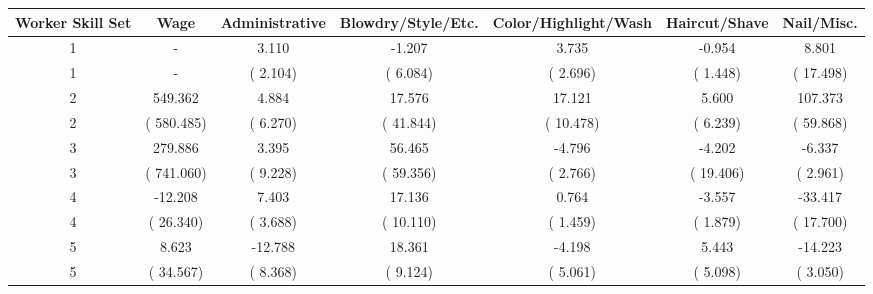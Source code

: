 
\centering
\begin{tabular}[t]{ccccccc}
\toprule
Worker Skill Set & Wage & Administrative & Blowdry/Style/Etc. & Color/Highlight/Wash & Haircut/Shave & Nail/Misc.\\
\midrule
1 & - & 3.110 & -1.207 & 3.735 & -0.954 & 8.801\\
1 & - & (    2.104) & (    6.084) & (    2.696) & (    1.448) & (   17.498)\\
2 & 549.362 & 4.884 & 17.576 & 17.121 & 5.600 & 107.373\\
2 & (  580.485) & (    6.270) & (   41.844) & (   10.478) & (    6.239) & (   59.868)\\
3 & 279.886 & 3.395 & 56.465 & -4.796 & -4.202 & -6.337\\
3 & (  741.060) & (    9.228) & (   59.356) & (    2.766) & (   19.406) & (    2.961)\\
4 & -12.208 & 7.403 & 17.136 & 0.764 & -3.557 & -33.417\\
4 & (   26.340) & (    3.688) & (   10.110) & (    1.459) & (    1.879) & (   17.700)\\
5 & 8.623 & -12.788 & 18.361 & -4.198 & 5.443 & -14.223\\
5 & (   34.567) & (    8.368) & (    9.124) & (    5.061) & (    5.098) & (    3.050)\\
\bottomrule
\end{tabular}